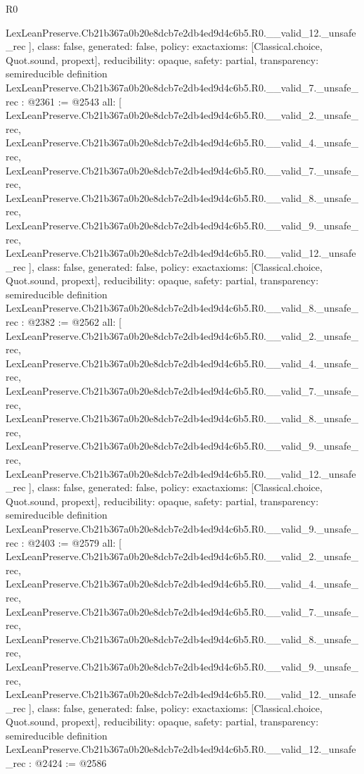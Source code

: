 \begin{lexlean}{R0}
\begin{coremodule}
{    LexLeanPreserve.Cb21b367a0b20e8dcb7e2db4ed9d4c6b5.R0.__valid_12._unsafe_rec
  ],
  class: false,
  generated: false,
  policy: exact{axioms: [Classical.choice, Quot.sound, propext]},
  reducibility: opaque{},
  safety: partial,
  transparency: semireducible
}
definition LexLeanPreserve.Cb21b367a0b20e8dcb7e2db4ed9d4c6b5.R0.__valid_7._unsafe_rec : @2361 := @2543 {
  all: [
    LexLeanPreserve.Cb21b367a0b20e8dcb7e2db4ed9d4c6b5.R0.__valid_2._unsafe_rec,
    LexLeanPreserve.Cb21b367a0b20e8dcb7e2db4ed9d4c6b5.R0.__valid_4._unsafe_rec,
    LexLeanPreserve.Cb21b367a0b20e8dcb7e2db4ed9d4c6b5.R0.__valid_7._unsafe_rec,
    LexLeanPreserve.Cb21b367a0b20e8dcb7e2db4ed9d4c6b5.R0.__valid_8._unsafe_rec,
    LexLeanPreserve.Cb21b367a0b20e8dcb7e2db4ed9d4c6b5.R0.__valid_9._unsafe_rec,
    LexLeanPreserve.Cb21b367a0b20e8dcb7e2db4ed9d4c6b5.R0.__valid_12._unsafe_rec
  ],
  class: false,
  generated: false,
  policy: exact{axioms: [Classical.choice, Quot.sound, propext]},
  reducibility: opaque{},
  safety: partial,
  transparency: semireducible
}
definition LexLeanPreserve.Cb21b367a0b20e8dcb7e2db4ed9d4c6b5.R0.__valid_8._unsafe_rec : @2382 := @2562 {
  all: [
    LexLeanPreserve.Cb21b367a0b20e8dcb7e2db4ed9d4c6b5.R0.__valid_2._unsafe_rec,
    LexLeanPreserve.Cb21b367a0b20e8dcb7e2db4ed9d4c6b5.R0.__valid_4._unsafe_rec,
    LexLeanPreserve.Cb21b367a0b20e8dcb7e2db4ed9d4c6b5.R0.__valid_7._unsafe_rec,
    LexLeanPreserve.Cb21b367a0b20e8dcb7e2db4ed9d4c6b5.R0.__valid_8._unsafe_rec,
    LexLeanPreserve.Cb21b367a0b20e8dcb7e2db4ed9d4c6b5.R0.__valid_9._unsafe_rec,
    LexLeanPreserve.Cb21b367a0b20e8dcb7e2db4ed9d4c6b5.R0.__valid_12._unsafe_rec
  ],
  class: false,
  generated: false,
  policy: exact{axioms: [Classical.choice, Quot.sound, propext]},
  reducibility: opaque{},
  safety: partial,
  transparency: semireducible
}
definition LexLeanPreserve.Cb21b367a0b20e8dcb7e2db4ed9d4c6b5.R0.__valid_9._unsafe_rec : @2403 := @2579 {
  all: [
    LexLeanPreserve.Cb21b367a0b20e8dcb7e2db4ed9d4c6b5.R0.__valid_2._unsafe_rec,
    LexLeanPreserve.Cb21b367a0b20e8dcb7e2db4ed9d4c6b5.R0.__valid_4._unsafe_rec,
    LexLeanPreserve.Cb21b367a0b20e8dcb7e2db4ed9d4c6b5.R0.__valid_7._unsafe_rec,
    LexLeanPreserve.Cb21b367a0b20e8dcb7e2db4ed9d4c6b5.R0.__valid_8._unsafe_rec,
    LexLeanPreserve.Cb21b367a0b20e8dcb7e2db4ed9d4c6b5.R0.__valid_9._unsafe_rec,
    LexLeanPreserve.Cb21b367a0b20e8dcb7e2db4ed9d4c6b5.R0.__valid_12._unsafe_rec
  ],
  class: false,
  generated: false,
  policy: exact{axioms: [Classical.choice, Quot.sound, propext]},
  reducibility: opaque{},
  safety: partial,
  transparency: semireducible
}
definition LexLeanPreserve.Cb21b367a0b20e8dcb7e2db4ed9d4c6b5.R0.__valid_12._unsafe_rec : @2424 := @2586 {
}
\end{coremodule}
\end{lexlean}
